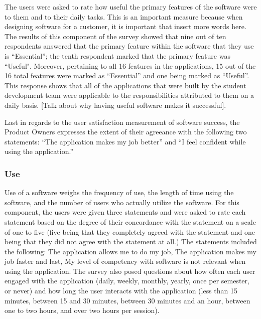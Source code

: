 The users were asked to rate how useful the primary features of the software were to them and to their daily tasks. This is an important measure because when designing software for a customer, it is important that {insert more words here}. The results of this component of the survey showed that nine out of ten respondents answered that the primary feature within the software that they use is ``Essential''; the tenth respondent marked that the primary feature was ``Useful". Moreover, pertaining to all 16 features in the applications, 15 out of the 16 total features were marked as ``Essential'' and one being marked as ``Useful''. This response shows that all of the applications that were built by the student development team were applicable to the responsibilities attributed to them on a daily basis. [Talk about why having useful software makes it successful].

Last in regards to the user satisfaction measurement of software success, the Product Owners expresses the extent of their agreeance with the following two statements: ``The application makes my job better'' and ``I feel confident while using the application.''

 \subsubsection{Use}
Use of a software weighs the frequency of use, the length of time using the software, and the number of users who actually utilize the software. For this component, the users were given three statements and were asked to rate each statement based on the degree of  their concordance with the statement on a scale of one to five (five being that they completely agreed with the statement and one being that they did not agree with the statement at all.) The statements included the following: The application allows me to do my job, The application makes my job faster and last, My level of competency with software is not relevant when using the application. The survey also posed questions about how often each user engaged with the application (daily, weekly, monthly, yearly, once per semester, or never)  and how long the user interacts with the application (less than 15 minutes, between 15 and 30 minutes, between 30 minutes and an hour, between one to two hours, and over two hours per session).

\paragraph{}

